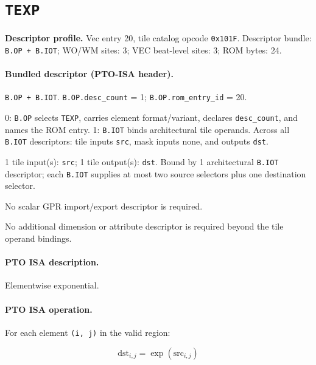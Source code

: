 \section{\texttt{TEXP}}
\noindent\textbf{Descriptor profile.} Vec entry 20, tile catalog opcode \texttt{0x101F}. Descriptor bundle: \texttt{B.OP + B.IOT}; WO/WM sites: 3; VEC beat-level sites: 3; ROM bytes: 24.\par\smallskip
{}
\paragraph{Bundled descriptor (PTO-ISA header).}
\begin{description}[leftmargin=0.18\linewidth,style=nextline]
\item[Bundle] \texttt{B.OP + B.IOT}. \texttt{B.OP.desc\_count} = 1; \texttt{B.OP.rom\_entry\_id} = 20.
\item[Assembly] 0: \texttt{B.OP} selects \texttt{TEXP}, carries element format/variant, declares \texttt{desc\_count}, and names the ROM entry. 1: \texttt{B.IOT} binds architectural tile operands. Across all \texttt{B.IOT} descriptors: tile inputs \texttt{src}, mask inputs none, and outputs \texttt{dst}.
\item[Tile operands] 1 tile input(s): \texttt{src}; 1 tile output(s): \texttt{dst}. Bound by 1 architectural \texttt{B.IOT} descriptor; each \texttt{B.IOT} supplies at most two source selectors plus one destination selector.
\item[Scalar GPR operands] No scalar GPR import/export descriptor is required.
\item[Metadata operands] No additional dimension or attribute descriptor is required beyond the tile operand bindings.
\end{description}
\par\smallskip
{\small
\paragraph{PTO ISA description.}
Elementwise exponential.
\paragraph{PTO ISA operation.}
For each element \texttt{(i, j)} in the valid region:

\[
\mathrm{dst}_{i,j} = \exp(\mathrm{src}_{i,j})
\]
}\par\smallskip
